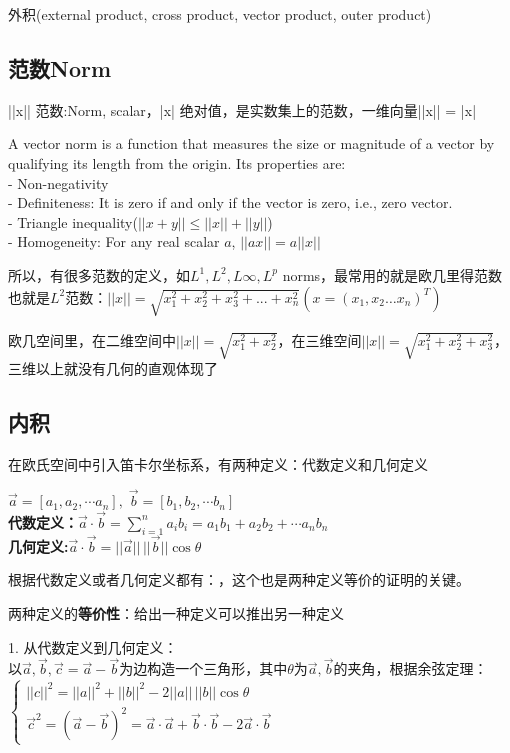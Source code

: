 \documentclass[../main.tex]{subfiles}
\begin{document}
外积(external product, cross product, vector product, outer product)

\subsection{范数Norm}
||x|| 范数:Norm, scalar，|x| 绝对值，是实数集上的范数，一维向量||x|| = |x|

A vector norm is a function that measures the size or magnitude of a vector by qualifying its length from the origin. Its properties are:\\
- Non-negativity\\
- Definiteness: It is zero if and only if the vector is zero, i.e., zero vector.\\
- Triangle inequality($||x+y||\le ||x||+||y||$)\\
- Homogeneity: For any real scalar $a$, $||ax||=a||x||$

所以，有很多范数的定义，如$L^1, L^2, L\infty, L^p$ norms，最常用的就是欧几里得范数也就是$L^2$范数：$||x||= \sqrt{x_1^2+x_2^2+x_3^2+...+x_n^2} (x=(x_1,x_2\ldots x_n)^{T})$

欧几空间里，在二维空间中$||x||=\sqrt{x_1^2+x_2^2}$，在三维空间$||x||=\sqrt{x_1^2+x_2^2+x_3^2}$，三维以上就没有几何的直观体现了

\subsection{内积}
在欧氏空间中引入笛卡尔坐标系，有两种定义：代数定义和几何定义

 $\vec a=\left[a_1,a_2,\cdots a_n\right], \; \vec b=\left[b_1,b_2, \cdots b_n\right]$\\
\textbf{代数定义：}$\vec a \cdot \vec b = \sum_{i=1}^na_ib_i=a_1b_1+a_2b_2+\cdots a_nb_n$\\
\textbf{几何定义:}$\vec a \cdot \vec b=||\vec a|| \, ||\vec b|| \cos \theta$

根据代数定义或者几何定义都有：，这个也是两种定义等价的证明的关键。

两种定义的\textbf{等价性}：给出一种定义可以推出另一种定义

1. 从代数定义到几何定义：\\
以$\vec a, \vec b, \vec c=\vec a -\vec b$为边构造一个三角形，其中$\theta$为$\vec a, \vec b$的夹角，根据余弦定理：\\
$
  \left \{
    \begin{array}{l}
      ||c||^2=||a||^2+||b||^2-2||a|| \, ||b|| \cos \theta\\
      \vec c^2=(\vec a - \vec b)^2=\vec a \cdot \vec a + \vec b \cdot \vec b - 2\vec a \cdot \vec b
    \end{array}
  \right.
$
\end{document}
